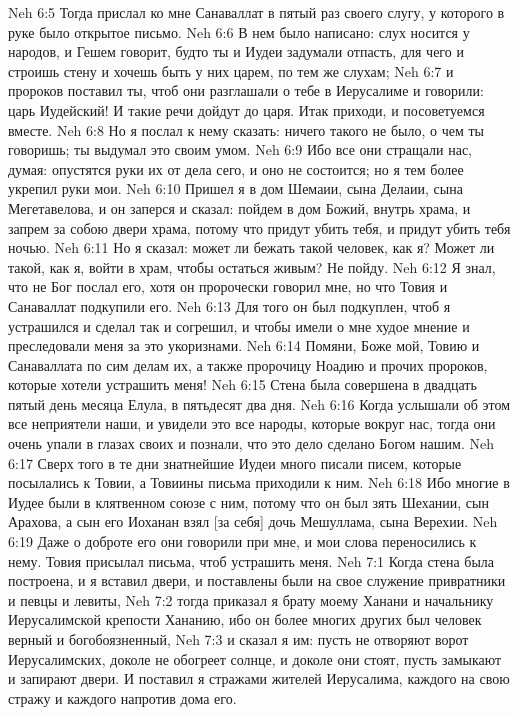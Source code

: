 Neh 6:5  Тогда прислал ко мне Санаваллат в пятый раз своего слугу, у которого в руке было открытое письмо.
Neh 6:6  В нем было написано: слух носится у народов, и Гешем говорит, будто ты и Иудеи задумали отпасть, для чего и строишь стену и хочешь быть у них царем, по тем же слухам;
Neh 6:7  и пророков поставил ты, чтоб они разглашали о тебе в Иерусалиме и говорили: царь Иудейский! И такие речи дойдут до царя. Итак приходи, и посоветуемся вместе.
Neh 6:8  Но я послал к нему сказать: ничего такого не было, о чем ты говоришь; ты выдумал это своим умом.
Neh 6:9  Ибо все они стращали нас, думая: опустятся руки их от дела сего, и оно не состоится; но я тем более укрепил руки мои.
Neh 6:10  Пришел я в дом Шемаии, сына Делаии, сына Мегетавелова, и он заперся и сказал: пойдем в дом Божий, внутрь храма, и запрем за собою двери храма, потому что придут убить тебя, и придут убить тебя ночью.
Neh 6:11  Но я сказал: может ли бежать такой человек, как я? Может ли такой, как я, войти в храм, чтобы остаться живым? Не пойду.
Neh 6:12  Я знал, что не Бог послал его, хотя он пророчески говорил мне, но что Товия и Санаваллат подкупили его.
Neh 6:13  Для того он был подкуплен, чтоб я устрашился и сделал так и согрешил, и чтобы имели о мне худое мнение и преследовали меня за это укоризнами.
Neh 6:14  Помяни, Боже мой, Товию и Санаваллата по сим делам их, а также пророчицу Ноадию и прочих пророков, которые хотели устрашить меня!
Neh 6:15  Стена была совершена в двадцать пятый день месяца Елула, в пятьдесят два дня.
Neh 6:16  Когда услышали об этом все неприятели наши, и увидели это все народы, которые вокруг нас, тогда они очень упали в глазах своих и познали, что это дело сделано Богом нашим.
Neh 6:17  Сверх того в те дни знатнейшие Иудеи много писали писем, которые посылались к Товии, а Товиины письма приходили к ним.
Neh 6:18  Ибо многие в Иудее были в клятвенном союзе с ним, потому что он был зять Шехании, сын Арахова, а сын его Иоханан взял [за себя] дочь Мешуллама, сына Верехии.
Neh 6:19  Даже о доброте его они говорили при мне, и мои слова переносились к нему. Товия присылал письма, чтоб устрашить меня.
Neh 7:1  Когда стена была построена, и я вставил двери, и поставлены были на свое служение привратники и певцы и левиты,
Neh 7:2  тогда приказал я брату моему Ханани и начальнику Иерусалимской крепости Хананию, ибо он более многих других был человек верный и богобоязненный,
Neh 7:3  и сказал я им: пусть не отворяют ворот Иерусалимских, доколе не обогреет солнце, и доколе они стоят, пусть замыкают и запирают двери. И поставил я стражами жителей Иерусалима, каждого на свою стражу и каждого напротив дома его.
